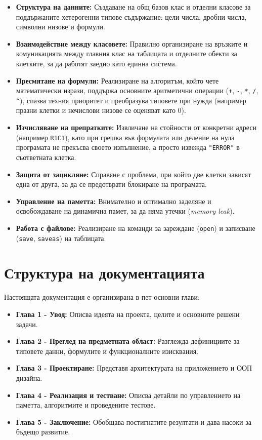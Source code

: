 \begin{itemize}
  \item \textbf{Структура на данните:} Създаване на общ базов клас и отделни класове за поддържаните хетерогенни типове съдържание: цели числа, дробни числа, символни низове и формули.
  \item \textbf{Взаимодействие между класовете:} Правилно организиране на връзките и комуникацията между главния клас на таблицата и отделните обекти за клетките, за да работят заедно като единна система.
  \item \textbf{Пресмятане на формули:} Реализиране на алгоритъм, който чете математически изрази, поддържа основните аритметични операции (\texttt{+}, \texttt{-}, \texttt{*}, \texttt{/}, \texttt{\^{}}), спазва техния приоритет и преобразува типовете при нужда (например празни клетки и нечислови низове се оценяват като 0).
  \item \textbf{Изчисляване на препратките:} Извличане на стойности от конкретни адреси (например \texttt{R1C1}), като при грешка във формулата или деление на нула програмата не прекъсва своето изпълнение, а просто извежда \texttt{"ERROR"} в съответната клетка.
  \item \textbf{Защита от зацикляне:} Справяне с проблема, при който две клетки зависят една от друга, за да се предотврати блокиране на програмата.
  \item \textbf{Управление на паметта:} Внимателно и оптимално заделяне и освобождаване на динамична памет, за да няма утечки (\textit{memory leak}).
  \item \textbf{Работа с файлове:} Реализиране на команди за зареждане (\texttt{open}) и записване (\texttt{save}, \texttt{saveas}) на таблицата.
\end{itemize}

\section{Структура на документацията}
Настоящата документация е организирана в пет основни глави:
\begin{itemize}
  \item \textbf{Глава 1 - Увод:} Описва идеята на проекта, целите и основните решени задачи.
  \item \textbf{Глава 2 - Преглед на предметната област:} Разглежда дефинициите за типовете данни, формулите и функционалните изисквания.
  \item \textbf{Глава 3 - Проектиране:} Представя архитектурата на приложението и ООП дизайна.
  \item \textbf{Глава 4 - Реализация и тестване:} Описва детайли по управлението на паметта, алгоритмите и проведените тестове.
  \item \textbf{Глава 5 - Заключение:} Обобщава постигнатите резултати и дава насоки за бъдещо развитие.
\end{itemize}